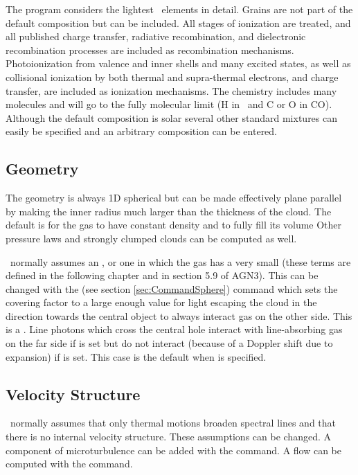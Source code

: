 \noindent The program considers the lightest \LIMELM\ elements in detail.
Grains are
not part of the default composition but can be included.
All stages of
ionization are treated, and all published charge transfer, radiative
recombination, and dielectronic recombination processes are included as
recombination mechanisms.
Photoionization from valence and inner shells
and many excited states, as well as collisional ionization by
both thermal and supra-thermal electrons, and charge transfer, are included as ionization mechanisms.
The chemistry includes many molecules and will go to the fully
molecular limit (H in \htwo\ and C or O in CO).
Although the default composition
is solar several other standard mixtures can easily be specified and an
arbitrary composition can be entered.

\subsection{Geometry}

\noindent The geometry is always 1D spherical but can be made effectively plane
parallel by making the inner radius much larger than the thickness of the
cloud.  The default is for the gas to have constant density and to fully
fill its volume
Other pressure laws and strongly clumped clouds can be computed as well.

\Cloudy\ normally assumes an ,
or one in which the gas has
a very small 
(these terms are defined in the following chapter
and in section 5.9 of AGN3).
This can be changed with
the  (see section \ref{sec:CommandSphere}) command which sets the covering factor
to a large enough value for light escaping
the cloud in the direction towards the central object to always interact
gas on the other side.
This is a .
Line photons which
cross the central hole interact with line-absorbing gas on the far side
if  is set but do not interact (because of a Doppler shift
due to expansion) if  is set.
This case is the default when  is specified.

\subsection{Velocity Structure}

\noindent \Cloudy\ normally assumes that only thermal motions broaden spectral lines and that there is no internal velocity structure.
These assumptions can be changed.
A component of microturbulence can be added with the
 command.
A flow can be computed with the  command.

